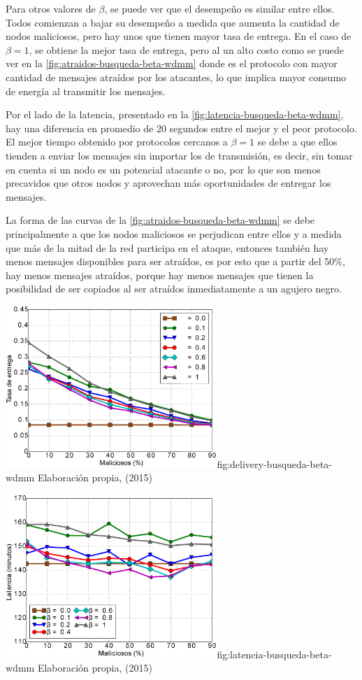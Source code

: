 Para otros valores de $\beta$, se puede ver que el desempeño es similar entre
ellos. Todos comienzan a bajar su desempeño a medida que aumenta la cantidad de
nodos maliciosos, pero hay unos que tienen mayor tasa de entrega. En el caso de
$\beta = 1$, se obtiene la mejor tasa de entrega, pero al un alto costo como se
puede ver en la \ref{fig:atraidos-busqueda-beta-wdmm} donde es el protocolo con
mayor cantidad de mensajes atraídos por los atacantes, lo que implica mayor
consumo de energía al transmitir los mensajes.

Por el lado de la latencia, presentado en la
\ref{fig:latencia-busqueda-beta-wdmm}, hay una diferencia en promedio de 20
segundos entre el mejor y el peor protocolo. El mejor tiempo obtenido por
protocolos cercanos a $\beta = 1$ se debe a que ellos tienden a enviar los
mensajes sin importar los \tickets{} de transmisión, es decir, sin tomar en
cuenta si un nodo es un potencial atacante o no, por lo que son menos precavidos
que otros nodos y aprovechan más oportunidades de entregar los mensajes.

La forma de las curvas de la \ref{fig:atraidos-busqueda-beta-wdmm} se debe
principalmente a que los nodos maliciosos se perjudican entre ellos y a medida
que más de la mitad de la red participa en el ataque, entonces también hay menos
mensajes disponibles para ser atraídos, es por esto que a partir del 50\%, hay
menos mensajes atraídos, porque hay menos mensajes que tienen la posibilidad de
ser copiados al ser atraídos inmediatamente a un agujero negro.


{\includegraphics[width=0.6\textwidth]{imagenes/seguridad/graficos/delivery_busqueda_beta.eps}}{fig:delivery-busqueda-beta-wdmm}
{Elaboración propia, (2015)}

{\includegraphics[width=0.6\textwidth]{imagenes/seguridad/graficos/latencia_busqueda.eps}}{fig:latencia-busqueda-beta-wdmm}
{Elaboración propia, (2015)}

